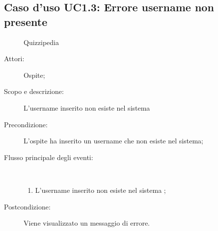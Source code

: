 \subsection{Caso d'uso UC1.3: Errore username non presente}
	\begin{figure}[H]
		\centering
		\begin{resizedtikzpicture}{\textwidth}
		\begin{umlsystem}[x=0, fill=lightgray!20]{Quizzipedia}
		\end{umlsystem}
		\end{resizedtikzpicture}
		\caption{}
	\end{figure}
\begin{description}
\item[Attori:] Ospite;
\item[Scopo e descrizione:] L'username inserito non esiste nel sistema
      \item[Precondizione:] L'ospite ha inserito un username che non esiste nel sistema;

        \item[Flusso principale degli eventi:] \ 
 \begin{enumerate}
          \item L'username inserito non esiste nel sistema
;

      \end{enumerate}
    \item[Postcondizione:] Viene visualizzato un messaggio di errore.
  \end{description}
\hypertarget{UC1.4}{}
